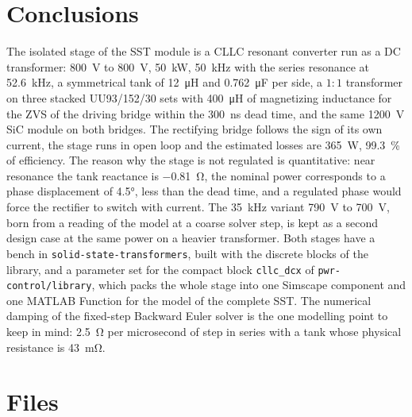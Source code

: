 \documentclass[12pt,a4paper]{scrartcl}
\newcommand{\code}[1]{\texttt{#1}}
\begin{document}
\begin{onehalfspace}
\section{Conclusions}
\label{sec:conclusions}

The isolated stage of the SST module is a CLLC resonant converter run as a DC transformer: \SI{800}{\volt} to \SI{800}{\volt}, \SI{50}{\kilo\watt}, \SI{50}{\kilo\hertz} with the series resonance at \SI{52.6}{\kilo\hertz}, a symmetrical tank of \SI{12}{\micro\henry} and \SI{0.762}{\micro\farad} per side, a $1:1$ transformer on three stacked UU93/152/30 sets with \SI{400}{\micro\henry} of magnetizing inductance for the ZVS of the driving bridge within the \SI{300}{\nano\second} dead time, and the same \SI{1200}{\volt} SiC module on both bridges. The rectifying bridge follows the sign of its own current, the stage runs in open loop and the estimated losses are \SI{365}{\watt}, \SI{99.3}{\percent} of efficiency. The reason why the stage is not regulated is quantitative: near resonance the tank reactance is \SI{-0.81}{\ohm}, the nominal power corresponds to a phase displacement of \ang{4.5}, less than the dead time, and a regulated phase would force the rectifier to switch with current. The \SI{35}{\kilo\hertz} variant \SI{790}{\volt} to \SI{700}{\volt}, born from a reading of the model at a coarse solver step, is kept as a second design case at the same power on a heavier transformer. Both stages have a bench in \code{solid-state-transformers}, built with the discrete blocks of the library, and a parameter set for the compact block \code{cllc\_dcx} of \code{pwr-control/library}, which packs the whole stage into one Simscape component and one MATLAB Function for the model of the complete SST. The numerical damping of the fixed-step Backward Euler solver is the one modelling point to keep in mind: \SI{2.5}{\ohm} per microsecond of step in series with a tank whose physical resistance is \SI{43}{\milli\ohm}.

\appendix
\section{Files}
\label{sec:files}


\end{onehalfspace}
\end{document}
